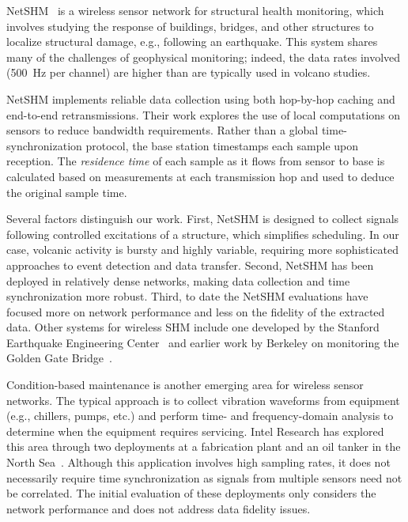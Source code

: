 NetSHM~\cite{netshm-ewsnsubmission,netshm-emnets05,wisan} is a wireless
sensor network for structural health monitoring, which involves studying the
response of buildings, bridges, and other structures to localize structural
damage, e.g., following an earthquake. This system shares many of the
challenges of geophysical monitoring; indeed, the data rates involved (500~Hz
per channel) are higher than are typically used in volcano studies. 

NetSHM implements reliable data collection using both hop-by-hop caching and
end-to-end retransmissions. Their work explores the use of local computations
on sensors to reduce bandwidth requirements.  Rather than a global
time-synchronization protocol, the base station timestamps each sample upon
reception. The {\em residence time} of each sample as it flows from sensor to
base is calculated based on measurements at each transmission hop and used to
deduce the original sample time.

Several factors distinguish our work. First, NetSHM is designed to collect
signals following controlled excitations of a structure, which simplifies
scheduling.  In our case, volcanic activity is bursty and highly variable,
requiring more sophisticated approaches to event detection and data transfer.
Second, NetSHM has been deployed in relatively dense networks, making data
collection and time synchronization more robust.  Third, to date the NetSHM
evaluations have focused more on network performance and less on the fidelity
of the extracted data.  Other systems for wireless SHM include one developed
by the Stanford Earthquake Engineering
Center~\cite{wimms-lynch06,wimms-wang05} and earlier work by Berkeley on
monitoring the Golden Gate Bridge~\cite{ggb-monitoring}.

Condition-based maintenance is another emerging area for wireless sensor
networks. The typical approach is to collect vibration waveforms from
equipment (e.g., chillers, pumps, etc.) and perform time- and
frequency-domain analysis to determine when the equipment requires servicing.
Intel Research has explored this area through two deployments at a
fabrication plant and an oil tanker in the North
Sea~\cite{intel-northseasensys}. Although this application involves high
sampling rates, it does not necessarily require time synchronization as
signals from multiple sensors need not be correlated.  The initial evaluation
of these deployments only considers the network performance and does not
address data fidelity issues.

%

